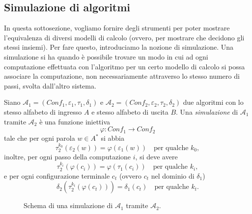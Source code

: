    
\subsection{Simulazione di algoritmi}

In questa sottosezione,
vogliamo fornire
degli strumenti per poter mostrare
l'equivalenza di diversi modelli di calcolo
(ovvero, per mostrare che decidono gli stessi insiemi).
Per fare questo, introduciamo la nozione di simulazione. 
Una simulazione si ha quando è possibile 
trovare un modo in cui ad ogni 
computazione effettuata con l'algoritmo 
per un certo modello di calcolo si 
possa associare la computazione, 
non necessariamente attraverso lo 
stesso numero di passi, 
svolta dall'altro sistema.

\begin{defi}
Siano $\mathcal{A}_1=(Conf_1,\varepsilon_1,\tau_1,\delta_1)$ e $\mathcal{A}_2=(Conf_2,\varepsilon_2,\tau_2,\delta_2)$ due algoritmi con lo stesso alfabeto di ingresso $A$ e stesso alfabeto di uscita $B$.
Una \emph{simulazione} di $\mathcal{A}_1$ tramite $\mathcal{A}_2$ è una funzione iniettiva
\[
\varphi : Conf_1 \to Conf_2
\]
tale che per ogni parola $w\in A^*$ si abbia
\[
\tau_2^{k_0}(\varepsilon_2(w))=\varphi(\varepsilon_1(w)) \quad\text{per qualche } k_0,
\]
inoltre, per ogni passo della computazione $i$, si deve avere
\[
\tau_2^{k_i}(\varphi(c_i))=\varphi(\tau_1(c_i)) \quad\text{per qualche } k_i,
\]
e per ogni configurazione terminale $c_t$ (ovvero $c_t$ nel dominio di $\delta_1$)
\[
\delta_2(\tau_2^{k_t}(\varphi(c_t)))=\delta_1(c_t) \quad\text{per qualche } k_t.
\]
\end{defi}

\begin{figure}[H]
\centering
{}
\caption{Schema di una simulazione di $\mathcal{A}_1$ tramite $\mathcal{A}_2$.}
\label{fig:simulazione}
\end{figure}

